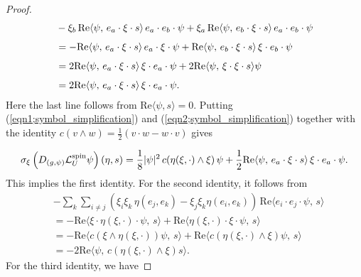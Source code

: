 \documentclass{amsart}
\theoremstyle{definition}
\theoremstyle{remark}
\numberwithin{equation}{section}
\begin{document}
\begin{proof}
	\begin{equation}\label{eqn2;symbol_simplification}
		\begin{aligned}
		& - \xi_b\, \textup{Re}\langle\psi,\, e_a\cdot \xi\cdot s\rangle \, e_a\cdot e_b\cdot \psi + \xi_a\, \textup{Re}\langle\psi,\, e_b\cdot \xi\cdot s\rangle \, e_a\cdot e_b\cdot \psi\\[1ex]
		&= -  \textup{Re}\langle\psi,\, e_a\cdot \xi\cdot s\rangle \, e_a\cdot \xi\cdot \psi +  \textup{Re}\langle\psi,\, e_b\cdot \xi\cdot s\rangle \, \xi\cdot e_b\cdot \psi \\[1ex]
		&=  2 \textup{Re}\langle\psi,\,  e_a\cdot  \xi\cdot s\rangle \, \xi\cdot e_a\cdot \psi + 2 \textup{Re}\langle\psi,\, \xi\cdot \xi\cdot s\rangle \psi\\[1ex]
		&= 2 \textup{Re}\langle\psi,\,  e_a\cdot  \xi\cdot s\rangle \, \xi\cdot e_a\cdot \psi.
		\end{aligned}
	\end{equation}
	Here the last line follows from $\text{Re}\langle\psi, s\rangle = 0$.
	Putting (\ref{eqn1;symbol_simplification}) and (\ref{eqn2;symbol_simplification}) together with the identity $c(v\wedge w) = \frac{1}{2}(v\cdot w-w\cdot v)$ gives
	
\begin{equation}\label{eqn3;symbol_simplification}
	\begin{aligned}
		\sigma_{\xi}\left(D_{(g,\psi)}\mathcal{L}_{U}^{\text{spin}}\psi\right)(\eta,s)=  \frac{1}{8}|\psi|^2\, c(\eta(\xi,\cdot)\wedge \xi)\,\psi +\frac{1}{2}  \textup{Re}\langle\psi,\,  e_a\cdot  \xi\cdot s\rangle \, \xi\cdot e_a\cdot \psi.
	\end{aligned}
\end{equation}
 This implies the first identity. For the second identity, it follows from 
 	\begin{align*}
		 &- \sum_k\sum_{i\neq j}(\xi_i\xi_k\,\eta(e_j, e_k) - \xi_j\xi_k\eta(e_i, e_k))\,\text{Re}\langle e_i\cdot e_j\cdot \psi,\,s\rangle\\[1ex]
		 &= -\text{Re}\langle\xi\cdot \eta(\xi,\cdot)\cdot\psi,\,s\rangle + \text{Re}\langle\eta(\xi,\cdot)\cdot\xi\cdot\psi,\,s\rangle \\[1ex]
		 &= -\text{Re}\langle c(\xi\wedge \eta(\xi,\cdot))\psi,\,s\rangle + \text{Re}\langle c(\eta(\xi,\cdot)\wedge\xi) \psi,\,s\rangle\\[1ex]
		 &= -2\text{Re}\langle  \psi,\,c(\eta(\xi,\cdot)\wedge\xi) s\rangle.
	\end{align*}
	For the third identity, we have
	

\end{proof}
\end{document}
